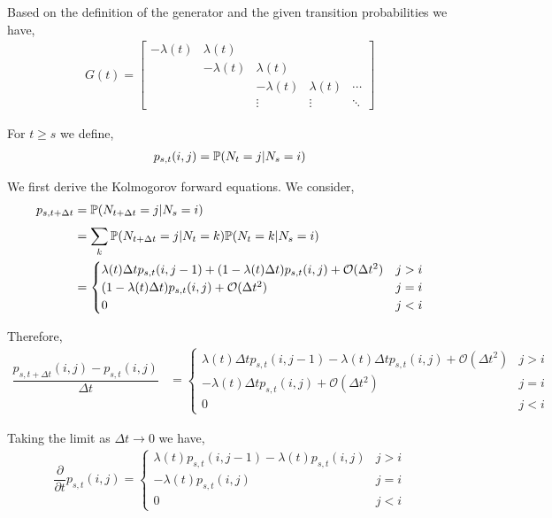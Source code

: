 \documentclass[10pt]{article}
\begin{document}
\begin{solution}[Solution]
Based on the definition of the generator and the given transition probabilities we have,
\begin{align*}
    G(t) = 
    \left[\begin{array}{rrrrr}
        -\lambda(t) & \lambda(t) \\
        & -\lambda(t) & \lambda(t) \\
        & & -\lambda(t) & \lambda(t) & \cdots \\
        & & \vdots & \vdots & \ddots
    \end{array}\right]
\end{align*}

For \( t\geq s \) we define, 
\begin{align*}
    p_{s,t}(i,j) = \mathbb{P}( N_t = j | N_s = i)
\end{align*}

We first derive the Kolmogorov forward equations. We consider,
\begin{align*}
    p_{s,t+\Delta t} &= \mathbb{P}( N_{t+\Delta t} = j | N_s = i) \\
    &= \sum_{k}^{} \mathbb{P}(N_{t+\Delta t}=j | N_t = k)\mathbb{P}(N_{t}=k | N_s=i) \\
    &= \begin{cases}
        \lambda(t)\Delta t p_{s,t}(i,j-1) 
        +(1-\lambda(t)\Delta t) p_{s,t}(i,j) + \mathcal{O}(\Delta t^2) & j > i \\
        (1-\lambda(t)\Delta t) p_{s,t}(i,j) +\mathcal{O}(\Delta t^2) & j=i \\
        0 & j < i
    \end{cases}
\end{align*}

Therefore,
\begin{align*}
    \dfrac{p_{s,t+\Delta t}(i,j) - p_{s,t}(i,j)}{\Delta t} 
    &= \begin{cases}
        \lambda(t)\Delta t p_{s,t}(i,j-1) 
        -\lambda(t)\Delta t p_{s,t}(i,j) + \mathcal{O}(\Delta t^2) & j > i \\
        -\lambda(t)\Delta t p_{s,t}(i,j) +\mathcal{O}(\Delta t^2) & j=i \\
        0 & j < i
    \end{cases}
\end{align*}

Taking the limit as \( \Delta t \to 0  \) we have,
\begin{align*}
    \dfrac{\partial}{\partial t}p_{s,t}(i,j) = 
    \begin{cases}
        \lambda(t) p_{s,t}(i,j-1) 
        -\lambda(t)p_{s,t}(i,j) & j > i \\
        -\lambda(t)p_{s,t}(i,j) & j=i \\
        0 & j < i
    \end{cases}
\end{align*}


\end{solution}
\end{document}
